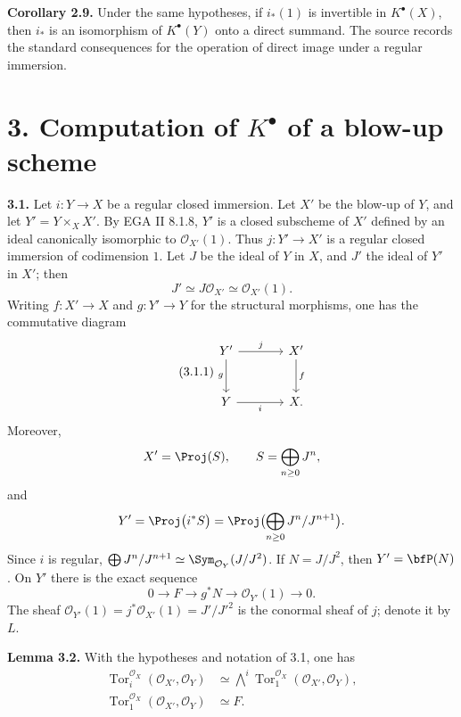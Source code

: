 \documentclass[11pt]{article}
\newcommand{\Tor}{\operatorname{Tor}}
\providecommand{\Tor}{\operatorname{Tor}}
\providecommand{\cO}{\mathcal O}
\begin{document}
\textbf{Corollary 2.9.} Under the same hypotheses, if \(i_*(1)\) is invertible in \(K^\bullet(X)\), then \(i_*\) is an isomorphism of \(K^\bullet(Y)\) onto a direct summand. The source records the standard consequences for the operation of direct image under a regular immersion.

\section*{3. Computation of \texorpdfstring{$K^\bullet$}{K} of a blow-up scheme}

\textbf{3.1.} Let \(i:Y\to X\) be a regular closed immersion. Let \(X'\) be the blow-up of \(Y\), and let \(Y'=Y\times_X X'\). By EGA II 8.1.8, \(Y'\) is a closed subscheme of \(X'\) defined by an ideal canonically isomorphic to \(\cO_{X'}(1)\). Thus \(j:Y'\to X'\) is a regular closed immersion of codimension \(1\). Let \(J\) be the ideal of \(Y\) in \(X\), and \(J'\) the ideal of \(Y'\) in \(X'\); then
\[
J'\simeq J\cO_{X'}\simeq\cO_{X'}(1).
\]
Writing \(f:X'\to X\) and \(g:Y'\to Y\) for the structural morphisms, one has the commutative diagram
\begin{equation}\tag{3.1.1}
\begin{tikzcd}[column sep=large,row sep=large]
Y' \arrow[r,"j"] \arrow[d,"g"'] & X' \arrow[d,"f"]\\
Y \arrow[r,"i"'] & X.
\end{tikzcd}
\end{equation}
Moreover,
\[
X'=\Proj(S),\qquad S=\bigoplus_{n\ge0}J^n,
\]
and
\[
Y'=\Proj\bigl(i^*S\bigr)
=\Proj\bigl(\bigoplus_{n\ge0}J^n/J^{n+1}\bigr).
\]
Since \(i\) is regular, \(\bigoplus J^n/J^{n+1}\simeq\Sym_{\cO_Y}(J/J^2)\). If \(N=J/J^2\), then \(Y'=\bfP(N)\). On \(Y'\) there is the exact sequence
\begin{equation}\tag{3.1.2}
0\to F\to g^*N\to\cO_{Y'}(1)\to0.
\end{equation}
The sheaf \(\cO_{Y'}(1)=j^*\cO_{X'}(1)=J'/J'^2\) is the conormal sheaf of \(j\); denote it by \(L\).

\textbf{Lemma 3.2.} With the hypotheses and notation of 3.1, one has
\begin{align}
\Tor_i^{\cO_X}(\cO_{X'},\cO_Y)&\simeq
\bigwedge^i\Tor_1^{\cO_X}(\cO_{X'},\cO_Y),\tag{3.2.i}\\
\Tor_1^{\cO_X}(\cO_{X'},\cO_Y)&\simeq F.\tag{3.2.ii}
\end{align}
\end{document}
